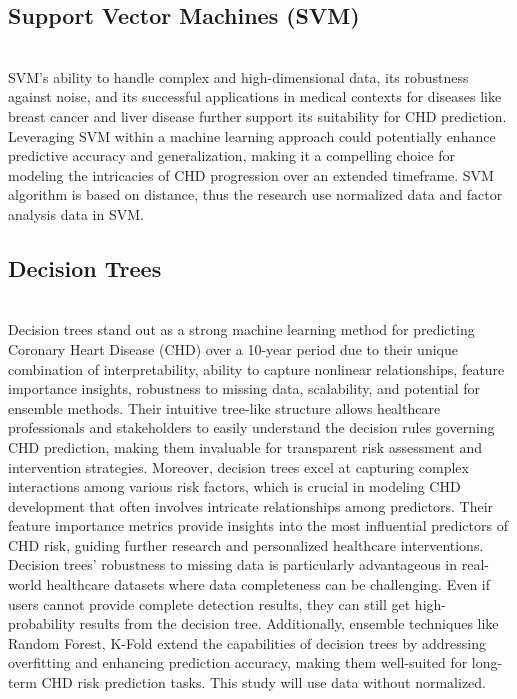 \documentclass[11pt]{article}
\begin{document}
\subsection{Support Vector Machines (SVM)}\\
\text SVM's ability to handle complex and high-dimensional data, its robustness against noise, and its successful applications in medical contexts for diseases like breast cancer and liver disease further support its suitability for CHD prediction. Leveraging SVM within a machine learning approach could potentially enhance predictive accuracy and generalization, making it a compelling choice for modeling the intricacies of CHD progression over an extended timeframe. SVM algorithm is based on distance, thus the research use normalized data and factor analysis data in SVM.
\subsection{Decision Trees}\\
\text Decision trees stand out as a strong machine learning method for predicting Coronary Heart Disease (CHD) over a 10-year period due to their unique combination of interpretability, ability to capture nonlinear relationships, feature importance insights, robustness to missing data, scalability, and potential for ensemble methods. Their intuitive tree-like structure allows healthcare professionals and stakeholders to easily understand the decision rules governing CHD prediction, making them invaluable for transparent risk assessment and intervention strategies. Moreover, decision trees excel at capturing complex interactions among various risk factors, which is crucial in modeling CHD development that often involves intricate relationships among predictors. Their feature importance metrics provide insights into the most influential predictors of CHD risk, guiding further research and personalized healthcare interventions. Decision trees' robustness to missing data is particularly advantageous in real-world healthcare datasets where data completeness can be challenging. Even if users cannot provide complete detection results, they can still get high-probability results from the decision tree. Additionally, ensemble techniques like Random Forest, K-Fold extend the capabilities of decision trees by addressing overfitting and enhancing prediction accuracy, making them well-suited for long-term CHD risk prediction tasks. This study will use data without normalized. 
\end{document}
